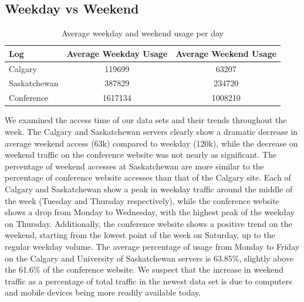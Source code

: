 \documentclass[10pt,conference]{IEEEtran}
\begin{document}
\subsection{Weekday vs Weekend} %
\label{sub:weekday_vs_weekend}
\begin{table}[h]
    \caption{Average weekday and weekend usage per day}\label{tab:weeklyusage}
    \begin{tabular}{l | c c}
        Log & Average Weekday Usage & Average Weekend Usage\\
        \hline
        Calgary & 119699 & 63207\\
        Saskatchewan & 387829 & 234720\\
        Conference & 1617134 & 1008210
    \end{tabular}
\end{table}

We examined the access time of our data sets and their trends throughout the week. The Calgary and Saskatchewan servers clearly show a dramatic decrease in average weekend access (63k) compared to weekday (120k), while the decrease on weekend traffic on the conference website was not nearly as significant. The percentage of weekend accesses at Saskatchewan are more similar to the percentage of conference website accesses than that of the Calgary site. Each of Calgary and Saskatchewan show a peak in weekday traffic around the middle of the week (Tuesday and Thursday respectively), while the conference website shows a drop from Monday to Wednesday, with the highest peak of the weekday on Thursday. Additionally, the conference website shows a positive trend on the weekend, starting from the lowest point of the week on Saturday, up to the regular weekday volume. 
The average percentage of usage from Monday to Friday on the Calgary and University of Saskatchewan servers is 63.85\%, slightly above the 61.6\% of the conference website. We suspect that the increase in weekend traffic as a percentage of total traffic in the newest data set is due to computers and mobile devices being more readily available today.
\end{document}
